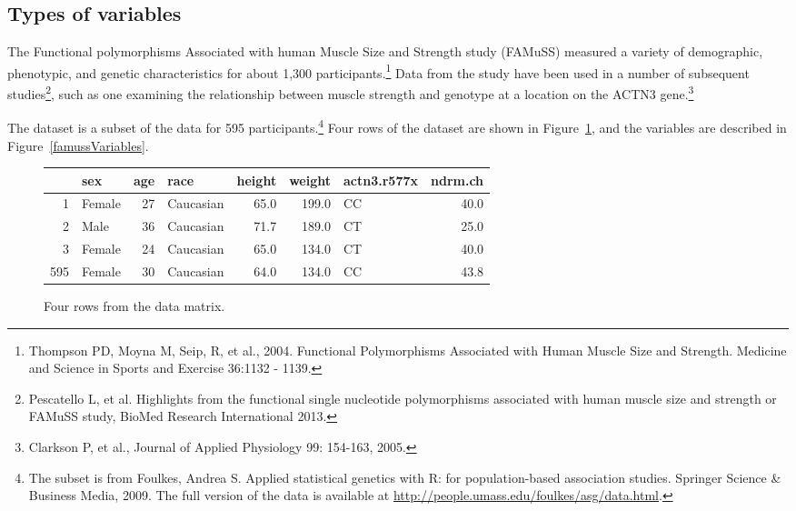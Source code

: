 

\subsection{Types of variables}
\label{variableTypes}


The Functional polymorphisms Associated with human Muscle Size and Strength study (FAMuSS) measured a variety of demographic, phenotypic, and genetic characteristics for about 1,300 participants.\footnote{Thompson PD, Moyna M, Seip, R, et al., 2004.  Functional Polymorphisms Associated with Human Muscle Size and Strength.  Medicine and Science in Sports and Exercise 36:1132 - 1139.} Data from the study have been used in a number of subsequent studies\footnote{Pescatello L, et al. Highlights from the functional single nucleotide polymorphisms associated with human muscle size and strength or FAMuSS study, BioMed Research International 2013.}, such as one examining the relationship between muscle strength and genotype at a location on the ACTN3 gene.\footnote{Clarkson P, et al., Journal of Applied Physiology 99: 154-163, 2005.} 

The  dataset is a subset of the data for 595 participants.\footnote{The subset is from Foulkes, Andrea S. Applied statistical genetics with R: for population-based association studies. Springer Science \& Business Media, 2009. The full version of the data is available at \url{http://people.umass.edu/foulkes/asg/data.html}.} Four rows of the  dataset are shown in Figure~\ref{famussDF}, and the variables are described in Figure~\ref{famussVariables}.

\begin{figure}[h]
	\centering
	\begin{tabular}{rlrlrrlr}
		\hline
		& sex & age & race & height & weight & actn3.r577x & ndrm.ch \\ 
		\hline
		1 & Female & 27 & Caucasian & 65.0 & 199.0 & CC & 40.0 \\ 
		2 & Male & 36 & Caucasian & 71.7 & 189.0 & CT & 25.0 \\ 
		3 & Female & 24 & Caucasian & 65.0 & 134.0 & CT & 40.0 \\ 
		595 & Female & 30 & Caucasian & 64.0 & 134.0 & CC & 43.8 \\ 
		\hline
	\end{tabular}
	\caption{Four rows from the  data matrix.}
	\label{famussDF}
\end{figure}

